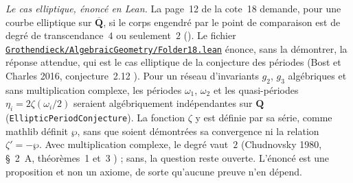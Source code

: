 \noindent\emph{Le cas elliptique, énoncé en Lean.} La page~12 de la cote~18 demande, pour une courbe elliptique sur $\overline{\mathbf Q}$, si le corps engendré par le point de comparaison est de degré de transcendance~$4$ ou seulement~$2$ (). Le fichier \href{\leanblobmain/AlgebraicGeometry/Folder18.lean}{\texttt{Grothendieck/AlgebraicGeometry/Folder18.lean}} énonce, sans la démontrer, la réponse attendue, qui est le cas elliptique de la conjecture des périodes (Bost et Charles 2016, conjecture~2.12 \cite{bostcharles2016}). Pour un réseau d'invariants $g_2$, $g_3$ algébriques et sans multiplication complexe, les périodes $\omega_1$, $\omega_2$ et les quasi-périodes $\eta_i = 2\zeta(\omega_i/2)$ seraient algébriquement indépendantes sur $\mathbf Q$ (\texttt{EllipticPeriodConjecture}). La fonction $\zeta$ y est définie par sa série, comme mathlib définit $\wp$, sans que soient démontrées sa convergence ni la relation $\zeta' = -\wp$. Avec multiplication complexe, le degré vaut~$2$ (Chudnovsky 1980, §~2~A, théorèmes~1 et~3 \cite{chudnovsky1980}) ; sans, la question reste ouverte. L'énoncé est une proposition et non un axiome, de sorte qu'aucune preuve n'en dépend.

